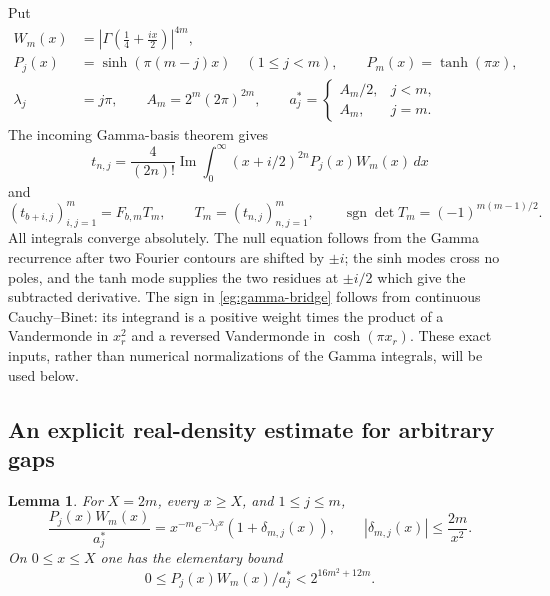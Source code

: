 \documentclass[11pt,a4paper]{article}
\numberwithin{equation}{section}
\newtheorem{lemma}[theorem]{Lemma}
\theoremstyle{definition}
\theoremstyle{remark}
\begin{document}
Put
\begin{align*}
 W_m(x)&=\left|\Gamma\!\left(\tfrac14+\tfrac{ix}{2}\right)\right|^{4m},\\
 P_j(x)&=\sinh(\pi(m-j)x)\quad(1\le j<m),\qquad
 P_m(x)=\tanh(\pi x),\\
 \lambda_j&=j\pi,\qquad A_m=2^m(2\pi)^{2m},\qquad
 a_j^*=\begin{cases}A_m/2,&j<m,\\ A_m,&j=m.
                   \end{cases}
\end{align*}
The incoming Gamma-basis theorem \cite{OrderedIncoming} gives
\begin{equation}\label{eg:gamma-coefficients}
 t_{n,j}=\frac4{(2n)!}\operatorname{Im}
       \int_0^\infty(x+i/2)^{2n}P_j(x)W_m(x)\,dx
\end{equation}
and
\begin{equation}\label{eg:gamma-bridge}
 (t_{b+i,j})_{i,j=1}^m=F_{b,m}T_m,\qquad
 T_m=(t_{n,j})_{n,j=1}^m,\qquad
 \operatorname{sgn}\det T_m=(-1)^{m(m-1)/2}.
\end{equation}
All integrals converge absolutely.  The null equation follows from
the Gamma recurrence after two Fourier contours are shifted by
$\pm i$; the sinh modes cross no poles, and the tanh mode supplies
the two residues at $\pm i/2$ which give the subtracted derivative.
The sign in \eqref{eg:gamma-bridge} follows from continuous
Cauchy--Binet: its integrand is a positive weight times the product
of a Vandermonde in $x_r^2$ and a reversed Vandermonde in
$\cosh(\pi x_r)$.  These exact inputs, rather than numerical
normalizations of the Gamma integrals, will be used below.

\subsection{An explicit real-density estimate for arbitrary gaps}

\begin{lemma}\label{eg:density}
For $X=2m$, every $x\ge X$, and $1\le j\le m$,
\begin{equation}\label{eg:density-bound}
 \frac{P_j(x)W_m(x)}{a_j^*}
   =x^{-m}e^{-\lambda_jx}(1+\delta_{m,j}(x)),
 \qquad |\delta_{m,j}(x)|\le\frac{2m}{x^2}.
\end{equation}
On $0\le x\le X$ one has the elementary bound
\begin{equation}\label{eg:compact-density}
 0\le P_j(x)W_m(x)/a_j^*<2^{16m^2+12m}.
\end{equation}
\end{lemma}
\end{document}
